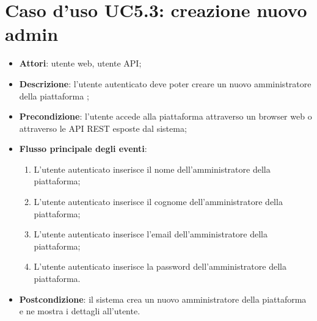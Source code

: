 \section{Caso d'uso UC5.3: creazione nuovo admin}
\begin{itemize}
\item \textbf{Attori}: utente web, utente API;
\item \textbf{Descrizione}: l'utente autenticato deve poter creare un nuovo amministratore della piattaforma ; 
      \item \textbf{Precondizione}: l'utente accede alla piattaforma attraverso un browser web o attraverso le API REST esposte dal sistema;

        \item \textbf{Flusso principale degli eventi}:
          \begin{enumerate}
          \item L'utente autenticato inserisce il nome dell'amministratore della piattaforma;
          \item L'utente autenticato inserisce il cognome dell'amministratore della piattaforma;
          \item L'utente autenticato inserisce l'email dell'amministratore della piattaforma;
          \item L'utente autenticato inserisce la password dell'amministratore della piattaforma.

      \end{enumerate}
    \item \textbf{Postcondizione}: il sistema crea un nuovo amministratore della piattaforma e ne mostra i dettagli all'utente.
  \end{itemize}
\hypertarget{UC5.4}{}
